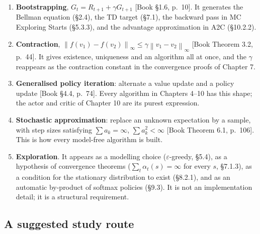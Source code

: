 \documentclass[11pt, letterpaper]{article}
\theoremstyle{runin}
\theoremstyle{runinplain}
\theoremstyle{remark}
\newcommand{\norm}[1]{\left\lVert #1 \right\rVert}
\newcommand{\bkin}[1]{{\color{bookblue}\small[\textsf{Book #1}]}}
\begin{document}
\begin{enumerate}
  \item \textbf{Bootstrapping}, $G_t=R_{t+1}+\gamma G_{t+1}$ \bkin{\S1.6, p.~10}.
        It generates the Bellman equation (\S2.4), the TD target (\S7.1), the
        backward pass in MC Exploring Starts (\S5.3.3), and the advantage
        approximation in A2C (\S10.2.2).
  \item \textbf{Contraction}, $\norm{f(v_1)-f(v_2)}_\infty\le\gamma\norm{v_1-v_2}_\infty$
        \bkin{Theorem 3.2, p.~44}. It gives existence, uniqueness and an algorithm
        all at once, and the $\gamma$ reappears as the contraction constant in the
        convergence proofs of Chapter 7.
  \item \textbf{Generalised policy iteration}: alternate a value update and a policy
        update \bkin{\S4.4, p.~74}. Every algorithm in Chapters 4--10 has this shape;
        the actor and critic of Chapter 10 are its purest expression.
  \item \textbf{Stochastic approximation}: replace an unknown expectation by a
        sample, with step sizes satisfying $\sum a_k=\infty$, $\sum a_k^2<\infty$
        \bkin{Theorem 6.1, p.~106}. This is how every model-free algorithm is built.
  \item \textbf{Exploration}. It appears as a modelling choice ($\varepsilon$-greedy,
        \S5.4), as a hypothesis of convergence theorems ($\sum_t\alpha_t(s)=\infty$
        for every $s$, \S7.1.3), as a condition for the stationary distribution to
        exist (\S8.2.1), and as an automatic by-product of softmax policies
        (\S9.3). It is not an implementation detail; it is a structural requirement.
\end{enumerate}

\subsection*{A suggested study route}
\end{document}
